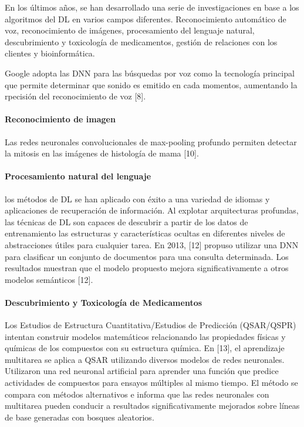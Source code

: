 En los últimos años, se han desarrollado una serie de investigaciones en base a los algoritmos del DL en varios campos diferentes. Reconocimiento automático de voz, reconocimiento de imágenes, procesamiento del lenguaje natural, descubrimiento y toxicología de medicamentos, gestión de relaciones con los clientes y bioinformática.

 Google adopta las DNN para las búsquedas por voz como la tecnología principal que permite determinar que sonido es emitido en cada momentos, aumentando la rpecisión del reconocimiento de voz [8].

\paragraph{Reconocimiento de imagen} Las redes neuronales convolucionales de max-pooling profundo permiten detectar la mitosis en las imágenes de histología de mama [10].

\paragraph{Procesamiento natural del lenguaje} los métodos de DL se han aplicado con éxito a una variedad de idiomas y aplicaciones de recuperación de información. Al explotar arquitecturas profundas, las técnicas de DL son capaces de descubrir a partir de los datos de entrenamiento las estructuras y características ocultas en diferentes niveles de abstracciones útiles para cualquier tarea. En 2013, [12] propuso utilizar una DNN para clasificar un conjunto de documentos para una consulta determinada. Los resultados muestran que el modelo propuesto mejora significativamente a otros modelos semánticos [12].

\paragraph{Descubrimiento y Toxicología de Medicamentos} Los Estudios de Estructura Cuantitativa/Estudios de Predicción (QSAR/QSPR) intentan construir modelos matemáticos relacionando las propiedades físicas y químicas de los compuestos con su estructura química. En [13], el aprendizaje multitarea se aplica a QSAR utilizando diversos modelos de redes neuronales. Utilizaron una red neuronal artificial para aprender una función que predice actividades de compuestos para ensayos múltiples al mismo tiempo. El método se compara con métodos alternativos e informa que las redes neuronales con multitarea pueden conducir a resultados significativamente mejorados sobre líneas de base generadas con bosques aleatorios.

